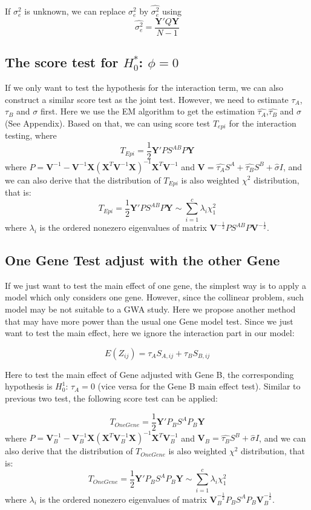 \documentclass{article}
\newcommand{\Y}{\mathbf{Y}}
\newcommand{\X}{\mathbf{X}}
\newcommand{\V}{\mathbf{V}}
\newcommand{\VV}{\mathbf{V}^{-1}}
\begin{document}
        If $\sigma^2_e$ is unknown, we can replace $\sigma^2_e$ by $\hat{\sigma^2_e}$ using
        \[
            \hat{\sigma^2_e}=\frac{\Y'Q\Y}{N-1}
        \]

        \subsection{The score test for $H_0^*$: $\phi=0$}
        If we only want to test the hypothesis for the interaction term, we can also construct a similar score test as the joint test. However, we need to estimate $\tau_A$, $\tau_B$ and $\sigma$ first. Here we use the EM algorithm to get the estimation $\hat{\tau_A}$,$\hat{\tau_B}$ and $\hat{\sigma}$(See Appendix). Based on that, we can using score test $T_{epi}$ for the interaction testing, where
        \[
            T_{Epi}=\frac{1}{2}\Y'PS^{AB}P\Y
        \]
        where $P=\VV-\VV\X(\X^T\VV\X)^{-1}\X^T\VV$ and $\V=\hat{\tau_A}S^A+\hat{\tau_B}S^B+\hat{\sigma}I$, and we can also derive that the distribution of $T_{Epi}$ is also weighted $\chi^2$ distribution, that is:
        \[
            T_{Epi}=\frac{1}{2}\Y'PS^{AB}P\Y\sim\sum_{i=1}^c\lambda_i\chi^2_1
        \]
        where $\lambda_i$ is the  ordered nonezero eigenvalues of matrix $\V^{-\frac{1}{2}}PS^{AB}P\V^{-\frac{1}{2}}$.

        \subsection{One Gene Test adjust with the other Gene}
        
        If we just want to test the main effect of one gene, the simplest way is to apply a model which only considers one gene. However, since the collinear problem, such model may be not suitable to a GWA study. Here we propose another method that may have more power than the usual one Gene model test. Since we just want to test the main effect, here we ignore the interaction part in our model:
        
        \[
            E(Z_{ij})=\tau_AS_{A,ij}+\tau_BS_{B,ij}
        \]
        
        Here to test the main effect of Gene adjusted with Gene B, the corresponding hypothesis is $H_0^1$: $\tau_A=0$ (vice versa for the Gene B main effect test). Similar to previous two test, the following score test can be applied:
        
        \[
            T_{OneGene}=\frac{1}{2}\Y'P_BS^{A}P_B\Y
        \]
        where $P=\VV_B-\VV_B\X(\X^T\VV_B\X)^{-1}\X^T\VV_B$ and $\V_B=\hat{\tau_B}S^B+\hat{\sigma}I$, and we can also derive that the distribution of $T_{OneGene}$ is also weighted $\chi^2$ distribution, that is:
        \[
            T_{OneGene}=\frac{1}{2}\Y'P_BS^{A}P_B\Y\sim\sum_{i=1}^c\lambda_i\chi^2_1
        \]
        where $\lambda_i$ is the  ordered nonezero eigenvalues of matrix $\V_B^{-\frac{1}{2}}P_BS^{A}P_B\V_B^{-\frac{1}{2}}$.
        
\end{document}
